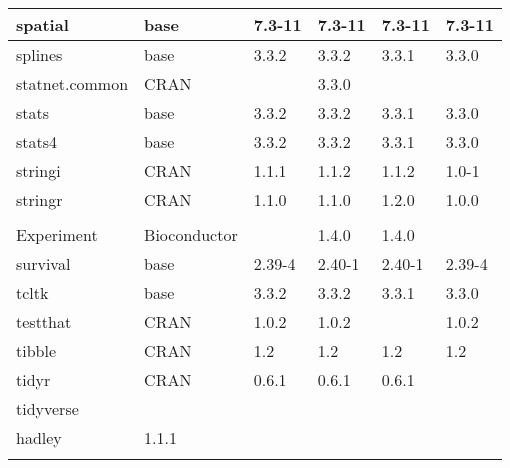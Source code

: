 \begin{longtable}{|llllll|}
spatial                       & base                      & 7.3-11      & 7.3-11      & 7.3-11         & 7.3-11           \\ \hline
splines                       & base                      & 3.3.2       & 3.3.2       & 3.3.1          & 3.3.0             \\ \hline \rowcolor{gray!25}
statnet.common                & CRAN                      &             & 3.3.0       &                &                  \\ \hline
stats                         & base                      & 3.3.2       & 3.3.2       & 3.3.1          & 3.3.0             \\ \hline \rowcolor{gray!25}
stats4                        & base                      & 3.3.2       & 3.3.2       & 3.3.1          & 3.3.0            \\ \hline
stringi                       & CRAN                      & 1.1.1       & 1.1.2       & 1.1.2          & 1.0-1             \\ \hline \rowcolor{gray!25}
stringr                       & CRAN                      & 1.1.0       & 1.1.0       & 1.2.0          & 1.0.0            \\ \hline
\begin{tabular}[c]{@{}l@{}}Summarized\\Experiment \end{tabular}          & Bioconductor              &             & 1.4.0       & 1.4.0          &                   \\ \hline \rowcolor{gray!25}
survival                      & base                      & 2.39-4      & 2.40-1      & 2.40-1         & 2.39-4           \\ \hline
tcltk                         & base                      & 3.3.2       & 3.3.2       & 3.3.1          & 3.3.0             \\ \hline \rowcolor{gray!25}
testthat                      & CRAN                      & 1.0.2       & 1.0.2       &                & 1.0.2            \\ \hline
tibble                        & CRAN                      & 1.2         & 1.2         & 1.2            & 1.2               \\ \hline \rowcolor{gray!25}
tidyr                         & CRAN                      & 0.6.1       & 0.6.1       & 0.6.1          &                  \\ \hline
tidyverse                     & \begin{tabular}[c]{@{}l@{}}GitHub \\ hadley \end{tabular}            & 1.1.1       &             &                &                   \\ \hline \rowcolor{gray!25}

\end{longtable}
